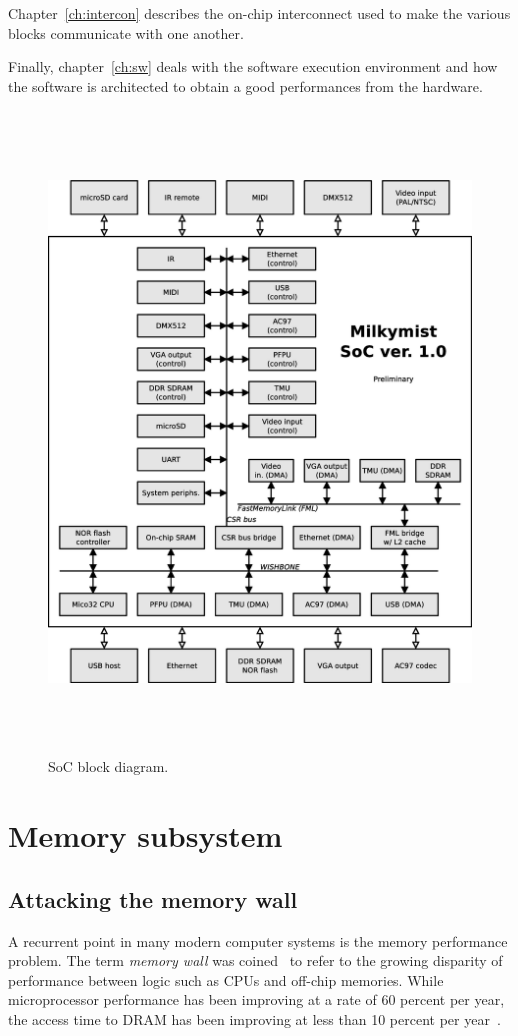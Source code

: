 \documentclass[a4paper,11pt]{kthesis}
\begin{document}
Chapter~\ref{ch:intercon} describes the on-chip interconnect used to make the various blocks communicate with one another.

Finally, chapter~\ref{ch:sw} deals with the software execution environment and how the software is architected to obtain a good performances from the hardware.

\begin{figure}
\centering
\includegraphics[height=170mm]{soc_architecture.eps}
\caption{SoC block diagram.}
\label{fig:block}
\end{figure}


\chapter{Memory subsystem}
\label{ch:memory}
\section{Attacking the memory wall}
\label{sec:memorywall}
A recurrent point in many modern computer systems is the memory performance problem. The term \textit{memory wall} was coined~\cite{memorywall} to refer to the growing disparity of performance between logic such as CPUs and off-chip memories. While microprocessor performance has been improving at a rate of 60 percent per year, the access time to DRAM has been improving at less than 10 percent per year~\cite{memvscpu}.
\end{document}
